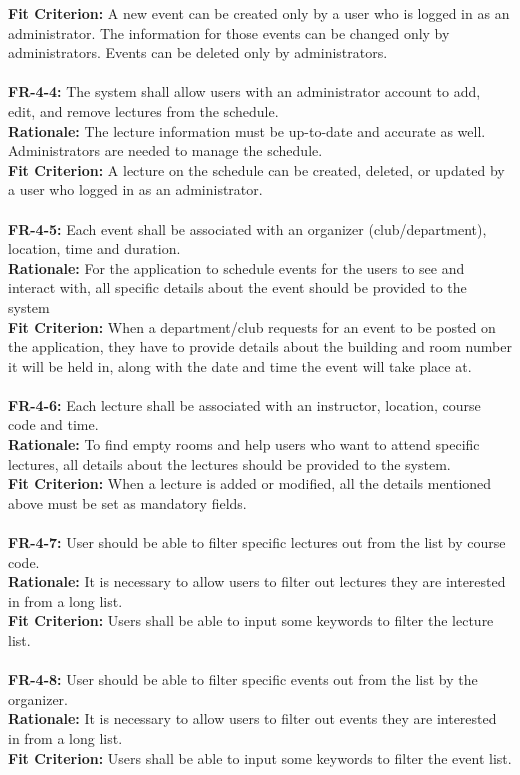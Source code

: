 \documentclass[12pt]{article}
\begin{document}
    \textbf{Fit Criterion:} A new event can be created only by a user who is logged in as an administrator. The information for those events can be changed only by administrators. Events can be deleted only by administrators.\\\\
    \textbf{FR-4-4:} The system shall allow users with an administrator account to add, edit, and remove lectures from the schedule.\\
    \textbf{Rationale:} The lecture information must be up-to-date and accurate as well. Administrators are needed to manage the schedule.\\
    \textbf{Fit Criterion:} A lecture on the schedule can be created, deleted, or updated by a user who logged in as an administrator.\\\\
    \textbf{FR-4-5:} Each event shall be associated with an organizer (club/department), location, time and duration.\\
    \textbf{Rationale:} For the application to schedule events for the users to see and interact with, all specific details about the event should be provided to the system\\
    \textbf{Fit Criterion:} When a department/club requests for an event to be posted on the application, they have to provide details about the building and room number it will be held in, along with the date and time the event will take place at.\\\\
    \textbf{FR-4-6:} Each lecture shall be associated with an instructor, location, course code and time.\\
    \textbf{Rationale:} To find empty rooms and help users who want to attend specific lectures, all details about the lectures should be provided to the system.\\
    \textbf{Fit Criterion:} When a lecture is added or modified, all the details mentioned above must be set as mandatory fields.\\\\
    \textbf{FR-4-7:} User should be able to filter specific lectures out from the list by course code.\\
    \textbf{Rationale:} It is necessary to allow users to filter out lectures they are interested in from a long list.\\
    \textbf{Fit Criterion:} Users shall be able to input some keywords to filter the lecture list.\\\\
    \textbf{FR-4-8:} User should be able to filter specific events out from the list by the organizer.\\
    \textbf{Rationale:} It is necessary to allow users to filter out events they are interested in from a long list.\\
    \textbf{Fit Criterion:} Users shall be able to input some keywords to filter the event list.\\\\
\end{document}
